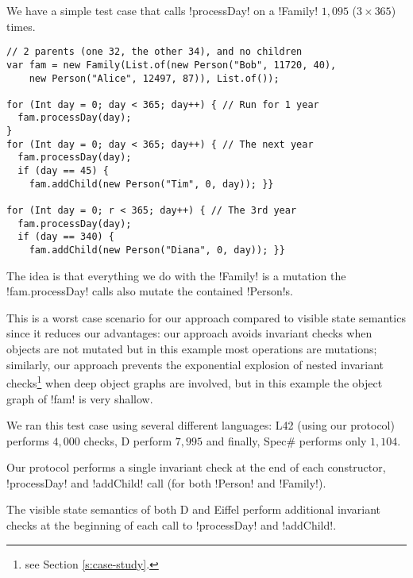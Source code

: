 \loseSpace
We have a simple test case that calls \Q!processDay! on a \Q!Family!\IODel{,} $1{,}095$ ($3\times365$) times.
\begin{lstlisting}
// 2 parents (one 32, the other 34), and no children
var fam = new Family(List.of(new Person("Bob", 11720, 40),
    new Person("Alice", 12497, 87)), List.of());
    
for (Int day = 0; day < 365; day++) { // Run for 1 year
  fam.processDay(day);
}
for (Int day = 0; day < 365; day++) { // The next year
  fam.processDay(day);
  if (day == 45) {
    fam.addChild(new Person("Tim", 0, day)); }}

for (Int day = 0; r < 365; day++) { // The 3rd year
  fam.processDay(day);
  if (day == 340) {
    fam.addChild(new Person("Diana", 0, day)); }}
\end{lstlisting}

The idea is that everything we do with the \Q!Family! is a mutation\IO{;}  the \Q!fam.processDay! calls also mutate the contained \Q!Person!s.

This is a worst case scenario for our approach compared to visible state semantics since it reduces our advantages:
our approach avoids invariant checks when objects are not mutated
but in this example most operations are mutations; 
similarly, our approach prevents the exponential explosion of nested invariant checks\footnote{ see Section \ref{s:case-study}.} when deep object graphs are involved, but in this example the object graph of \Q!fam! is very shallow.
\loseSpace

We ran this test case using several different languages: L42 (using our protocol) performs $4{,}000$ checks, D  perform $7{,}995$ and finally, Spec\# performs only $1{,}104$.

Our protocol performs a single invariant check at the end of each constructor,  \Q!processDay! and \Q!addChild! call (for both \Q!Person! and \Q!Family!). 

The visible state semantics of both D and Eiffel perform additional invariant checks at the beginning of each call to \Q!processDay! and \Q!addChild!. 



